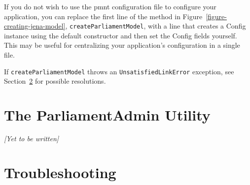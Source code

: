 If you do not wish to use the \ac{pmnt} configuration file to configure your application, you can replace the first line of the method in Figure~\ref{figure-creating-jena-model}, \verb|createParliamentModel|, with a line that creates a Config instance using the default constructor and then set the Config fields yourself.  This may be useful for centralizing your application's configuration in a single file.

If \verb|createParliamentModel| throws an \verb|UnsatisfiedLinkError| exception, see Section~\ref{section-troubleshooting} for possible resolutions.

\section{The ParliamentAdmin Utility}
\label{section-parliamentadmin-utility}

\emph{[Yet to be written]}

\section{Troubleshooting}
\label{section-troubleshooting}

